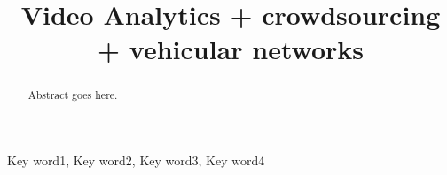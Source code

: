 \documentclass[conference]{IEEEtran}
\begin{document}
\title{Video Analytics + crowdsourcing + vehicular networks}


\maketitle

\thispagestyle{fancy} %
\lhead{} %
\chead{} %
\rhead{} %
\lfoot{} %
\cfoot{} %
\rfoot{\thepage} %
\renewcommand{\headrulewidth}{0pt} %
\renewcommand{\footrulewidth}{0pt} %
\pagestyle{fancy}
\rfoot{\thepage}


\begin{abstract}
Abstract goes here.
\end{abstract}

\begin{IEEEkeywords}
Key word1, Key word2, Key word3, Key word4
\end{IEEEkeywords}





















\end{document}
